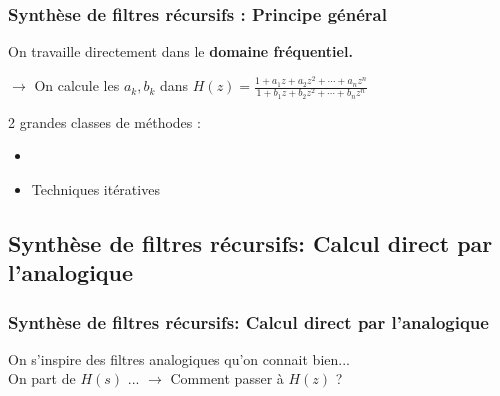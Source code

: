 \documentclass{beamer}
\begin{document}
\begin{frame}
\frametitle{Synthèse de filtres récursifs : Principe général}

 
\begin{block}{}
On travaille directement dans le \textbf{domaine fréquentiel.}
\end{block}
\vspace{1cm}
$\rightarrow$ On calcule les $a_k,b_k$ dans $H(z) = \frac{\displaystyle 1+ a_1 z + a_2 z^2 + \cdots + a_n z^n }{\displaystyle 1+ b_1 z + b_2 z^2 + \cdots + b_n z^n}$ \\
\vspace{1cm}

2 grandes classes de méthodes : 
\begin{itemize}
\item<2->  
\vspace{0.3cm}

\item<3-> Techniques itératives

\end{itemize}
\end{frame}

\subsection{Synthèse de filtres récursifs: Calcul direct par l'analogique}

\begin{frame}
\frametitle{Synthèse de filtres récursifs: Calcul direct par l'analogique}
On s'inspire des filtres analogiques qu'on connait bien...\\
\vspace{1cm}
On part de $H(s)$ ... $\rightarrow$ Comment passer à $H(z)$ ?\\
\vspace{1cm}
\end{frame}
\end{document}
